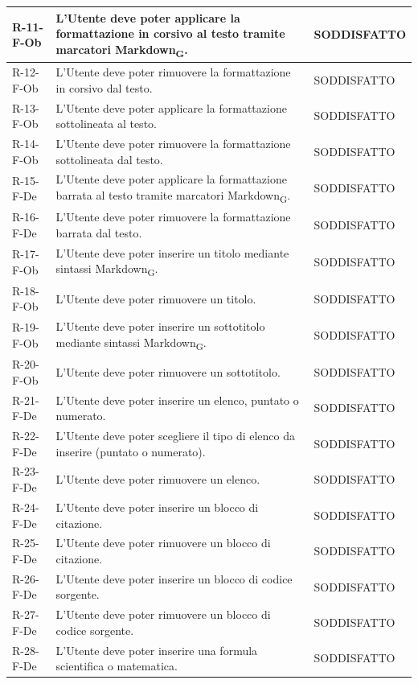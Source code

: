 \documentclass[a4paper, 10pt]{article}
\begin{document}
\begin{longtable}{|p{2.1cm}|p{9.6cm}|p{2.6cm}|}
    R-11-F-Ob & L'Utente deve poter applicare la formattazione in corsivo al testo tramite marcatori Markdown\textsubscript{G}. & SODDISFATTO \\ \hline
    R-12-F-Ob & L'Utente deve poter rimuovere la formattazione in corsivo dal testo. & SODDISFATTO \\ \hline
    R-13-F-Ob & L'Utente deve poter applicare la formattazione sottolineata al testo. & SODDISFATTO \\ \hline
    R-14-F-Ob & L'Utente deve poter rimuovere la formattazione sottolineata dal testo. & SODDISFATTO \\ \hline
    R-15-F-De & L'Utente deve poter applicare la formattazione barrata al testo tramite marcatori Markdown\textsubscript{G}. & SODDISFATTO \\ \hline
    R-16-F-De & L'Utente deve poter rimuovere la formattazione barrata dal testo. & SODDISFATTO \\ \hline
    R-17-F-Ob & L'Utente deve poter inserire un titolo mediante sintassi Markdown\textsubscript{G}. & SODDISFATTO \\ \hline
    R-18-F-Ob & L'Utente deve poter rimuovere un titolo. & SODDISFATTO \\ \hline
    R-19-F-Ob & L'Utente deve poter inserire un sottotitolo mediante sintassi Markdown\textsubscript{G}. & SODDISFATTO \\ \hline
    R-20-F-Ob & L'Utente deve poter rimuovere un sottotitolo. & SODDISFATTO \\ \hline
    R-21-F-De & L'Utente deve poter inserire un elenco, puntato o numerato. & SODDISFATTO \\ \hline
    R-22-F-De & L'Utente deve poter scegliere il tipo di elenco da inserire (puntato o numerato). & SODDISFATTO \\ \hline
    R-23-F-De & L'Utente deve poter rimuovere un elenco. & SODDISFATTO \\ \hline
    R-24-F-De & L'Utente deve poter inserire un blocco di citazione. & SODDISFATTO \\ \hline
    R-25-F-De & L'Utente deve poter rimuovere un blocco di citazione. & SODDISFATTO \\ \hline
    R-26-F-De & L'Utente deve poter inserire un blocco di codice sorgente. & SODDISFATTO \\ \hline
    R-27-F-De & L'Utente deve poter rimuovere un blocco di codice sorgente. & SODDISFATTO \\ \hline
    R-28-F-De & L'Utente deve poter inserire una formula scientifica o matematica. & SODDISFATTO \\ \hline

\end{longtable}
\end{document}

